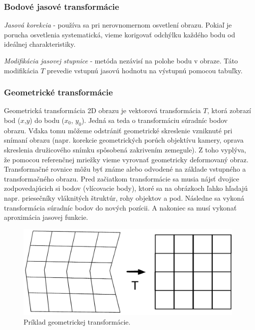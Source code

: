 \subsubsection{Bodové jasové transformácie}

\textit{Jasová korekcia} - používa sa pri nerovnomernom osvetlení obrazu. Pokiaľ je porucha
osvetlenia systematická, vieme korigovať odchýlku každého bodu od ideálnej charakteristiky. \cite{pocitacove_videnie_v_praxi}

\textit{Modifikácia jasovej stupnice} - metóda nezávisí na polohe bodu v obraze. Táto modifikácia $T$ prevedie vstupnú jasovú hodnotu na výstupnú pomocou tabuľky. \cite{pocitacove_videnie_v_praxi}


\subsubsection{Geometrické transformácie}
Geometrická transformácia 2D obrazu je vektorová transformácia $T$, ktorá zobrazí bod ($x$,$y$) do bodu ($x_0$, $y_0$). Jedná sa teda o transformáciu súradníc bodov obrazu. Vďaka tomu môžeme odstrániť geometrické skreslenie vzniknuté pri snímaní obrazu (napr. korekcie geometrických porúch objektívu kamery, oprava skreslenia družicového snímku spôsobená zakrivením zemegule). Z toho vyplýva, že pomocou referenčnej mriežky vieme vyrovnať geometricky deformovaný obraz. Transformačné rovnice môžu byť známe alebo odvodené na základe vstupného a transformačného obrazu. Pred začiatkom transformácie sa musia nájsť dvojice zodpovedajúcich si bodov (vlícovacie body), ktoré sa na obrázkoch ľahko hľadajú napr. priesečníky vláknitých štruktúr, rohy objektov a pod. Následne sa vykoná transformácia súradníc bodov do nových pozícii. A nakoniec sa musí vykonať aproximácia jasovej funkcie. \cite{Algorithms_and_Applications}

\begin{figure}[H]
\begin{center}
	\includegraphics[scale=0.4]{images/transform}
	\caption{Príklad geometrickej transformácie.}
	\end{center}
\end{figure}

